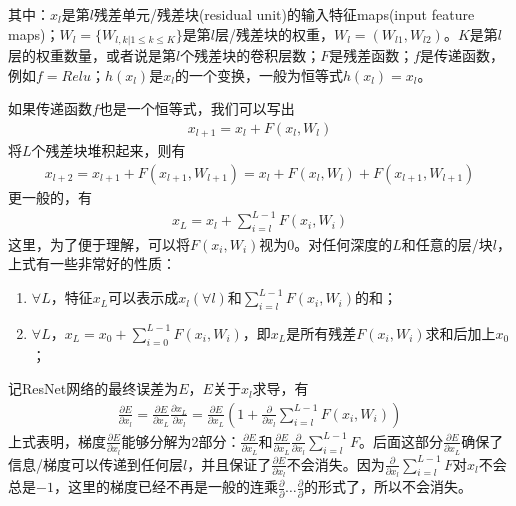             其中：$x_l$是第$l$残差单元/残差块(residual unit)的输入特征maps(input feature maps)；$W_l=\{W_{l,k|1 \leqslant k \leqslant K}\}$是第$l$层/残差块的权重，$W_l = (W_{l1},W_{l2})$。$K$是第$l$层的权重数量，或者说是第$l$个残差块的卷积层数；$F$是残差函数；$f$是传递函数，例如$f = Relu$；$h(x_l)$是$x_l$的一个变换，一般为恒等式$h(x_l) = x_l$。
            \par
            如果传递函数$f$也是一个恒等式，我们可以写出
            \begin{align*}
            x_{l+1} = x_l+F(x_l,W_l)
            \end{align*}
            将$L$个残差块堆积起来，则有
            \begin{align*}
            x_{l+2} = x_{l+1} + F(x_{l+1}, W_{l+1}) = x_l + F(x_l,W_l)+F(x_{l+1},W_{l+1})
            \end{align*}
            更一般的，有
            \begin{align*}
            x_L =x_l + \sum_{i=l}^{L-1}F(x_i,W_i)
            \end{align*}
            这里，为了便于理解，可以将$F(x_i,W_i)$视为0。对任何深度的$L$和任意的层/块$l$，上式有一些非常好的性质：
            \begin{enumerate}
            \item $\forall L$，特征$x_L$可以表示成$x_l(\forall l)$和$\sum\limits_{i=l}^{L-1}F(x_i,W_i)$的和；
            \item $\forall L$，$x_L =x_0 + \sum\limits_{i=0}^{L-1}F(x_i,W_i)$，即$x_L$是所有残差$F(x_i,W_i)$求和后加上$x_0$；
            \end{enumerate}
            \par
            记ResNet网络的最终误差为$E$，$E$关于$x_l$求导，有
            \begin{align*}
            \frac{\partial E}{\partial x_l} = \frac{\partial E}{\partial x_L} \frac{\partial x_L}{\partial x_l} = \frac{\partial E}{\partial x_L} \left( 1+\frac{\partial }{\partial x_l}\sum_{i=l}^{L-1}F(x_i,W_i) \right)
            \end{align*}
            上式表明，梯度$\frac{\partial E}{\partial x_l}$能够分解为2部分：$\frac{\partial E}{\partial x_L}$和$\frac{\partial E}{\partial x_L}\frac{\partial }{\partial x_l}\sum\limits_{i=l}^{L-1}F$。后面这部分$\frac{\partial E}{\partial x_L}$确保了信息/梯度可以传递到任何层$l$，并且保证了$\frac{\partial E}{\partial x_l}$不会消失。因为$\frac{\partial }{\partial x_l}\sum\limits_{i=l}^{L-1}F$对$x_l$不会总是$-1$，这里的梯度已经不再是一般的连乘$\frac{\partial }{\partial}\dots\frac{\partial }{\partial}$的形式了，所以不会消失。
